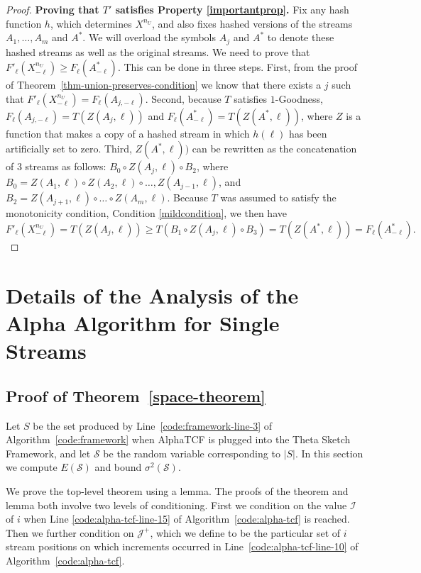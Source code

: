 \documentclass{article}
\newcommand{\xnu}{X^{n_U}}
\newcommand{\xnuml}{X^{n_{U}}_{-\ell}}
\begin{document}
\begin{proof}
\noindent \textbf{Proving that $T'$ satisfies Property \ref{importantprop}.}
Fix any hash function $h$, which determines $\xnu$, and also fixes hashed versions of
the streams $A_1, \dots, A_m$ and $A^*$. We will overload the symbols $A_j$ and $A^*$ to denote these hashed streams
as well as the original streams.
We need to prove that $F'_{\ell}(\xnuml) \ge F_{\ell}(A^*_{-\ell})$. 
This can be done in three steps. First, from the proof of Theorem~\ref{thm-union-preserves-condition}
we know that there exists a $j$ such that $F'_{\ell}(\xnuml) = F_{\ell}(A_{j, -\ell})$.
Second, because $T$ satisfies $1$-Goodness, 
$F_{\ell}(A_{j, -\ell}) = T(Z(A_j,\ell))$ and $F_{\ell}(A^*_{-\ell}) = T(Z(A^*,\ell))$, where $Z$ is a function that 
makes a copy of a hashed stream in which $h(\ell)$ has been artificially set to zero.
Third, $Z(A^*,\ell))$ can be rewritten as the concatenation of 3 streams as follows: $B_0 \circ Z(A_j,\ell)
\circ B_2$, where $B_0 = Z(A_1, \ell) \circ Z(A_2, \ell) \circ \dots, Z(A_{j-1}, \ell)$, and $B_2 = Z(A_{j+1}, \ell) \circ \dots \circ Z(A_m, \ell)$. 
Because $T$ was assumed to satisfy the monotonicity condition, Condition \ref{mildcondition}, we then have
\begin{equation}
F'_{\ell}(\xnuml) = 
T(Z(A_j,\ell)) \ge 
T(B_1 \circ Z(A_j,\ell) \circ B_3) =
T(Z(A^*,\ell)) =
F_{\ell}(A^*_{-\ell}). 
\end{equation}

\end{proof}

\section{Details of the Analysis of the Alpha Algorithm for Single Streams}

\subsection{Proof of Theorem~\ref{space-theorem}}\label{appendix-proof-of-space-theorem}

Let $S$ be the set produced by 
Line~\ref{code:framework-line-3}
of
Algorithm~\ref{code:framework}
when AlphaTCF is plugged
into the Theta Sketch Framework, 
and let $\mathcal{S}$ be the random variable corresponding to $|S|$.
In this section we compute $E(\mathcal{S})$ and bound $\sigma^2(\mathcal{S})$. 

We prove the top-level theorem using a lemma. The proofs of the theorem and lemma
both involve two levels of conditioning. First we condition on the value $\mathcal{I}$ of $i$ when 
Line \ref{code:alpha-tcf-line-15} of 
Algorithm~\ref{code:alpha-tcf} is reached.
Then we further condition on $\mathcal{J}^+$, which we define to be the
particular set of $i$ stream positions on which increments occurred in 
Line~\ref{code:alpha-tcf-line-10} of Algorithm~\ref{code:alpha-tcf}.
\end{document}
